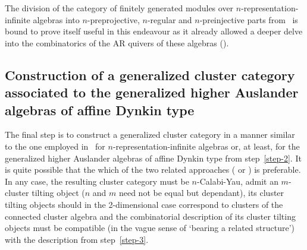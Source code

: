 \documentclass[a4paper,oneside,svgnames]{amsart}
\theoremstyle{plain}
\theoremstyle{definition}
\begin{document}
 The division of the category of finitely generated modules over
 $n$-representation-infinite algebras into $n$-preprojective, $n$-regular and
 $n$-preinjective parts from~\cite[Theorem 4.18]{hio} is bound to prove itself
 useful in this endeavour as it already allowed a deeper delve into the
 combinatorics of the AR quivers of these algebras (\cite{gll}).

 \subsection{Construction of a generalized cluster category associated to the
 generalized higher Auslander algebras of affine Dynkin type}

 The final step is to construct a generalized cluster category in a manner
 similar to the one employed in~\cite[Section~5]{ot} for
 $n$-representation-infinite algebras or, at least, for the generalized higher
 Auslander algebras of affine Dynkin type from step~\ref{step-2}. It is quite
 possible that the
 which of the two related approaches (\cite{amiot1} or \cite{guo}) is preferable.
 In any case, the resulting cluster category must be $n$-Calabi-Yau, admit an
 $m$-cluster tilting object ($n$ and $m$ need not be equal but dependant), its
 cluster tilting objects should in the 2-dimensional case correspond to clusters
 of the connected cluster algebra and the combinatorial description of its
 cluster tilting objects must be compatible (in the vague sense of `bearing a
 related structure') with the description from step~\ref{step-3}.
\end{document}
